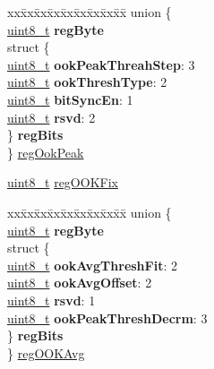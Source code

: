 \begin{DoxyCompactItemize}
\begin{tabbing}
\end{tabbing}\item 
\begin{tabbing}
xx\=xx\=xx\=xx\=xx\=xx\=xx\=xx\=xx\=\kill
union \{\\
\>\hyperlink{vl53l0x__types_8h_aba7bc1797add20fe3efdf37ced1182c5}{uint8\_t} {\bfseries regByte}\\
\>struct \{\\
\>\>\hyperlink{vl53l0x__types_8h_aba7bc1797add20fe3efdf37ced1182c5}{uint8\_t} {\bfseries ookPeakThreahStep}: 3\\
\>\>\hyperlink{vl53l0x__types_8h_aba7bc1797add20fe3efdf37ced1182c5}{uint8\_t} {\bfseries ookThreshType}: 2\\
\>\>\hyperlink{vl53l0x__types_8h_aba7bc1797add20fe3efdf37ced1182c5}{uint8\_t} {\bfseries bitSyncEn}: 1\\
\>\>\hyperlink{vl53l0x__types_8h_aba7bc1797add20fe3efdf37ced1182c5}{uint8\_t} {\bfseries rsvd}: 2\\
\>\} {\bfseries regBits}\\
\} \hyperlink{structFSK__Register__Map_aa9d2742d40ad17f24aacbf88098408a8}{regOokPeak}\\

\end{tabbing}\item 
\hyperlink{vl53l0x__types_8h_aba7bc1797add20fe3efdf37ced1182c5}{uint8\+\_\+t} \hyperlink{structFSK__Register__Map_ab3f42ae39895f99f4bbf807ba518a383}{reg\+O\+O\+K\+Fix}
\item 
\begin{tabbing}
xx\=xx\=xx\=xx\=xx\=xx\=xx\=xx\=xx\=\kill
union \{\\
\>\hyperlink{vl53l0x__types_8h_aba7bc1797add20fe3efdf37ced1182c5}{uint8\_t} {\bfseries regByte}\\
\>struct \{\\
\>\>\hyperlink{vl53l0x__types_8h_aba7bc1797add20fe3efdf37ced1182c5}{uint8\_t} {\bfseries ookAvgThreshFit}: 2\\
\>\>\hyperlink{vl53l0x__types_8h_aba7bc1797add20fe3efdf37ced1182c5}{uint8\_t} {\bfseries ookAvgOffset}: 2\\
\>\>\hyperlink{vl53l0x__types_8h_aba7bc1797add20fe3efdf37ced1182c5}{uint8\_t} {\bfseries rsvd}: 1\\
\>\>\hyperlink{vl53l0x__types_8h_aba7bc1797add20fe3efdf37ced1182c5}{uint8\_t} {\bfseries ookPeakThreshDecrm}: 3\\
\>\} {\bfseries regBits}\\
\} \hyperlink{structFSK__Register__Map_a8bc49b2b6b15dd9366328378bceb0c46}{regOOKAvg}\\


\end{tabbing}
\end{DoxyCompactItemize}
